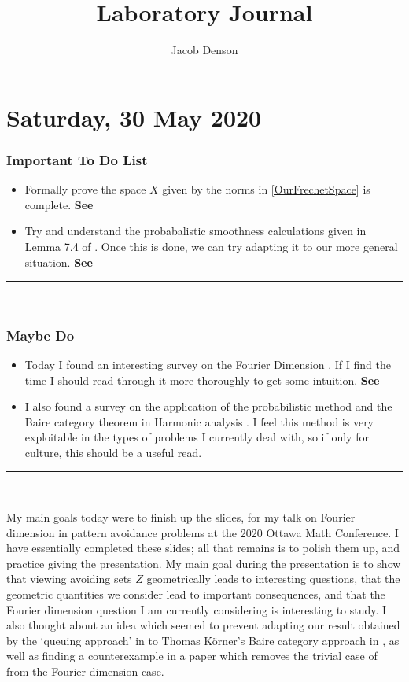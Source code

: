\documentclass[openany,nobib,nols,a4paper,twoside,symmetric,justified,notoc]{tufte-book}
\title{Laboratory Journal}
\author{Jacob Denson}
\theoremstyle{plain}
\theoremstyle{remark}
\theoremstyle{definition}
\newenvironment{importanttodo}%
    {\subsection{Important To Do List}}%
    {\vspace{2mm}\hrule\hspace{\stretch{1}}\\}
\newenvironment{maybedo}%
    {\subsection{Maybe Do}}%
    {\vspace{2mm}\hrule\hspace{\stretch{1}}\\}
\begin{document}
\maketitle
\tableofcontents
\newpage










\chapter{Saturday, 30 May 2020} \label{30052020}

\begin{importanttodo}
\begin{itemize}
    \item Formally prove the space $X$ given by the norms in \eqref{OurFrechetSpace} is complete. \textbf{See }

    \item Try and understand the probabalistic smoothness calculations given in Lemma 7.4 of \cite{Korner2009}. Once this is done, we can try adapting it to our more general situation. \textbf{See }
\end{itemize}
\end{importanttodo}

\begin{maybedo}
\begin{itemize}
    \item Today I found an interesting survey on the Fourier Dimension \cite{Ekstrom2017}. If I find the time I should read through it more thoroughly to get some intuition. \textbf{See }

    \item I also found a survey on the application of the probabilistic method and the Baire category theorem in Harmonic analysis \cite{Kahane2000}. I feel this method is very exploitable in the types of problems I currently deal with, so if only for culture, this should be a useful read.
\end{itemize}
\end{maybedo}

My main goals today were to finish up the slides, for my talk on Fourier dimension in pattern avoidance problems at the 2020 Ottawa Math Conference. I have essentially completed these slides; all that remains is to polish them up, and practice giving the presentation. My main goal during the presentation is to show that viewing avoiding sets $Z$ geometrically leads to interesting questions, that the geometric quantities we consider lead to important consequences, and that the Fourier dimension question I am currently considering is interesting to study. I also thought about an idea which seemed to prevent adapting our result obtained by the `queuing approach' in \cite{Denson2019} to Thomas K\"{o}rner's Baire category approach in \cite{Korner2009}, as well as finding a counterexample in a paper which removes the trivial case of \cite{Denson2019} from the Fourier dimension case.
\end{document}

